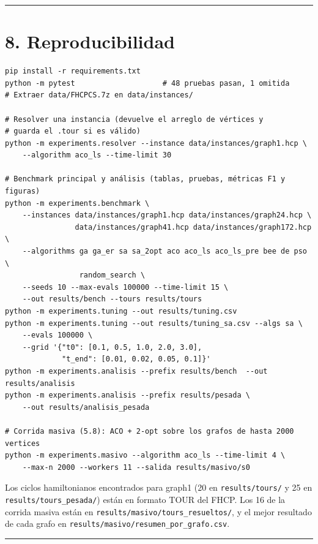 \documentclass[
  spanish,
  11pt,
]{article}
\begin{document}
\begin{center}\rule{0.5\linewidth}{0.5pt}\end{center}

\section{8. Reproducibilidad}\label{reproducibilidad}

\begin{Verbatim}[fontsize=\footnotesize,frame=single,framesep=6pt]
pip install -r requirements.txt
python -m pytest                    # 48 pruebas pasan, 1 omitida
# Extraer data/FHCPCS.7z en data/instances/

# Resolver una instancia (devuelve el arreglo de vértices y
# guarda el .tour si es válido)
python -m experiments.resolver --instance data/instances/graph1.hcp \
    --algorithm aco_ls --time-limit 30

# Benchmark principal y análisis (tablas, pruebas, métricas F1 y figuras)
python -m experiments.benchmark \
    --instances data/instances/graph1.hcp data/instances/graph24.hcp \
                data/instances/graph41.hcp data/instances/graph172.hcp \
    --algorithms ga ga_er sa sa_2opt aco aco_ls aco_ls_pre bee de pso \
                 random_search \
    --seeds 10 --max-evals 100000 --time-limit 15 \
    --out results/bench --tours results/tours
python -m experiments.tuning --out results/tuning.csv
python -m experiments.tuning --out results/tuning_sa.csv --algs sa \
    --evals 100000 \
    --grid '{"t0": [0.1, 0.5, 1.0, 2.0, 3.0],
             "t_end": [0.01, 0.02, 0.05, 0.1]}'
python -m experiments.analisis --prefix results/bench  --out results/analisis
python -m experiments.analisis --prefix results/pesada \
    --out results/analisis_pesada

# Corrida masiva (5.8): ACO + 2-opt sobre los grafos de hasta 2000 vertices
python -m experiments.masivo --algorithm aco_ls --time-limit 4 \
    --max-n 2000 --workers 11 --salida results/masivo/s0
\end{Verbatim}

Los ciclos hamiltonianos encontrados para graph1 (20 en
\texttt{results/tours/} y 25 en \texttt{results/tours\_pesada/}) están
en formato TOUR del FHCP. Los 16 de la corrida masiva están en
\texttt{results/masivo/tours\_resueltos/}, y el mejor resultado de cada
grafo en \texttt{results/masivo/resumen\_por\_grafo.csv}.

\begin{center}\rule{0.5\linewidth}{0.5pt}\end{center}
\end{document}
